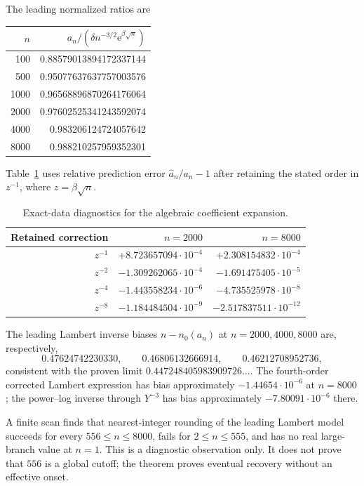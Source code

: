 \documentclass[11pt]{article}
\numberwithin{equation}{section}
\theoremstyle{definition}\newtheorem{definition}[theorem]{Definition}
\theoremstyle{remark}\newtheorem{remark}[theorem]{Remark}
\newcommand{\ee}{\mathrm e}
\begin{document}
The leading normalized ratios are
\begin{center}
\begin{tabular}{rr}
\toprule
$n$ & $a_n/(\delta n^{-3/2}\ee^{\beta\sqrt n})$\\
\midrule
100 & 0.88579013894172337144\\
500 & 0.95077637637757003576\\
1000 & 0.96568896870264176064\\
2000 & 0.97602525341243592074\\
4000 & 0.983206124724057642\\
8000 & 0.988210257959352301\\
\bottomrule
\end{tabular}
\end{center}
Table~\ref{lcp:tr:tab:errors} uses relative prediction error $\widehat a_n/a_n-1$ after retaining the stated order in $z^{-1}$, where $z=\beta\sqrt n$.
\begin{table}[ht]
\centering
\begin{tabular}{rrr}
\toprule
Retained correction & $n=2000$ & $n=8000$\\
\midrule
$z^{-1}$ & $+8.723657094\cdot10^{-4}$ & $+2.308154832\cdot10^{-4}$\\
$z^{-2}$ & $-1.309262065\cdot10^{-4}$ & $-1.691475405\cdot10^{-5}$\\
$z^{-4}$ & $-1.443558234\cdot10^{-6}$ & $-4.735525978\cdot10^{-8}$\\
$z^{-8}$ & $-1.184484504\cdot10^{-9}$ & $-2.517837511\cdot10^{-12}$\\
\bottomrule
\end{tabular}
\caption{Exact-data diagnostics for the algebraic coefficient expansion.}\label{lcp:tr:tab:errors}
\end{table}

The leading Lambert inverse biases $n-n_0(a_n)$ at $n=2000,4000,8000$ are, respectively,
\[
 0.47624742230330,\qquad0.46806132666914,\qquad0.46212708952736,
\]
consistent with the proven limit $0.447248405983909726\ldots$. The fourth-order corrected Lambert expression has bias approximately $-1.44654\cdot10^{-6}$ at $n=8000$; the power--log inverse through $Y^{-3}$ has bias approximately $-7.80091\cdot10^{-6}$ there.

A finite scan finds that nearest-integer rounding of the leading Lambert model succeeds for every $556\le n\le8000$, fails for $2\le n\le555$, and has no real large-branch value at $n=1$. This is a diagnostic observation only. It does not prove that $556$ is a global cutoff; the theorem proves eventual recovery without an effective onset.
\end{document}
